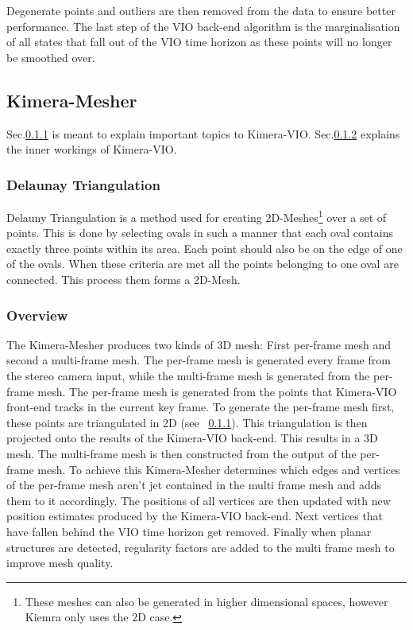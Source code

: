 \documentclass[11pt,a4paper]{article}
\begin{document}
Degenerate points and outliers are then removed from the data to ensure better performance.
The last step of the VIO back-end algorithm is the marginalisation of all states that fall out of the VIO time horizon as these points will no longer be smoothed over.


\subsection{Kimera-Mesher}
Sec.\ref{pre:delaunay} is meant to explain important topics to Kimera-VIO.
Sec.\ref{Sec:K-Mesher overview} explains the inner workings of Kimera-VIO.
\subsubsection{Delaunay Triangulation} \label{pre:delaunay}
Delauny Triangulation is a method used for creating 2D-Meshes\footnote{These meshes can also be generated in higher dimensional spaces, however Kiemra only uses the 2D case.} over a set of points.
This is done by selecting ovals in such a manner that each oval contains exactly three points within its area.
Each point should also be on the edge of one of the ovals.
When these criteria are met all the points belonging to one oval are connected.
This process them forms a 2D-Mesh.

\subsubsection{Overview} \label{Sec:K-Mesher overview}
The Kimera-Mesher produces two kinds of 3D mesh: 
First per-frame mesh and second a multi-frame mesh.
The per-frame mesh is generated every frame from the stereo camera input, while the multi-frame mesh is generated from the per-frame mesh.
The per-frame mesh is generated from the points that Kimera-VIO front-end tracks in the current key frame. 
To generate the per-frame mesh first, these points are triangulated in 2D (see ~\ref{pre:delaunay}).
This triangulation is then projected onto the results of the Kimera-VIO back-end. This results in a 3D mesh. 
The multi-frame mesh is then constructed from the output of the per-frame mesh.
To achieve this Kimera-Mesher determines which edges and vertices of the per-frame mesh aren't jet contained in the multi frame mesh and adds them to it accordingly. 
The positions of all vertices are then updated with new position estimates produced by the Kimera-VIO back-end.
Next vertices that have fallen behind the VIO time horizon get removed. 
Finally when planar structures are detected, regularity factors are added to the multi frame mesh to improve mesh quality.
\end{document}
